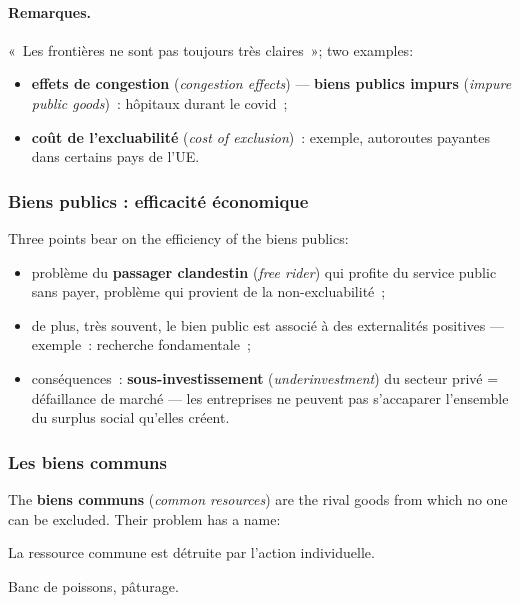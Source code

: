 \paragraph{Remarques.} «~Les frontières ne sont pas toujours très claires~»; two
examples:
\begin{itemize}
  \item \textbf{effets de congestion} (\textit{congestion effects}) ---
    \textbf{biens publics impurs} (\textit{impure public goods})~: hôpitaux
    durant le covid~;
  \item \textbf{coût de l'excluabilité} (\textit{cost of exclusion})~:
    exemple, autoroutes payantes dans certains pays de l'UE.
\end{itemize}

\subsubsection{Biens publics : efficacité économique}

Three points bear on the efficiency of the biens publics:
\begin{itemize}
  \item problème du \textbf{passager clandestin} (\textit{free rider}) qui
    profite du service public sans payer, problème qui provient de la
    non-excluabilité~;
  \item de plus, très souvent, le bien public est associé à des externalités
    positives --- exemple~: recherche fondamentale~;
  \item conséquences~: \textbf{sous-investissement} (\textit{underinvestment}) du
    secteur privé = défaillance de marché --- les entreprises ne peuvent pas
    s'accaparer l'ensemble du surplus social qu'elles créent.
\end{itemize}

\subsubsection{Les biens communs}

The \textbf{biens communs} (\textit{common resources}) are the rival goods from
which no one can be excluded. Their problem has a name:

\begin{definition}
  La ressource commune est détruite par l'action individuelle.
\end{definition}

\begin{example}
  Banc de poissons, pâturage.
\end{example}

